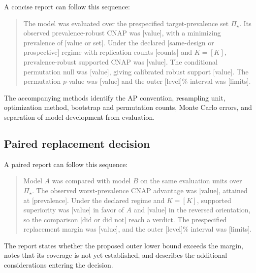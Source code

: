 \documentclass[11pt]{article}
\newcommand{\PSet}{\Pi_\star}
\theoremstyle{remark}
\begin{document}
A concise report can follow this sequence:
\begin{quote}
The model was evaluated over the prespecified target-prevalence set $\PSet$. Its observed prevalence-robust CNAP was [value], with a minimizing prevalence of [value or set]. Under the declared [same-design or prospective] regime with replication counts [counts] and $K=[K]$, prevalence-robust supported CNAP was [value]. The conditional permutation null was [value], giving calibrated robust support [value]. The permutation $p$-value was [value] and the outer [level]\% interval was [limits].
\end{quote}
The accompanying methods identify the AP convention, resampling unit, optimization method, bootstrap and permutation counts, Monte Carlo errors, and separation of model development from evaluation.

\subsection{Paired replacement decision}

A paired report can follow this sequence:
\begin{quote}
Model $A$ was compared with model $B$ on the same evaluation units over $\PSet$. The observed worst-prevalence CNAP advantage was [value], attained at [prevalence]. Under the declared regime and $K=[K]$, supported superiority was [value] in favor of $A$ and [value] in the reversed orientation, so the comparison [did or did not] reach a verdict. The prespecified replacement margin was [value], and the outer [level]\% interval was [limits].
\end{quote}
The report states whether the proposed outer lower bound exceeds the margin, notes that its coverage is not yet established, and describes the additional considerations entering the decision.
\end{document}
